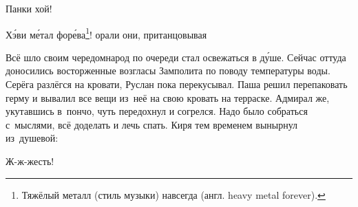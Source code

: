 %
%

\renewcommand*{\thefootnote}{\fnsymbol{footnote}}
\setcounter{footnote}{0}



\diagdash Панки хой!

\diagdash Х\'{э}ви м\'{е}тал фор\'{е}ва\footnote{Тяжёлый металл (стиль музыки) навсегда (англ. heavy metal forever).}! \mdash орали они, пританцовывая\myldots{}

\vspace{0.5cm}
\myldots{}Всё шло своим чередом\mdash народ по очереди стал освежаться в д\'{у}ше. Сейчас оттуда доносились восторженные возгласы Замполита по поводу температуры воды. Серёга разлёгся на кровати, Руслан пока перекусывал. Паша решил перепаковать герму и вывалил все вещи из~неё на свою кровать на терраске. Адмирал же, укутавшись в~пончо, чуть передохнул и согрелся. Надо было собраться с~мыслями, всё доделать и лечь спать. Киря тем временем вынырнул из~душевой:

\diagdash Ж-ж-жесть! 

